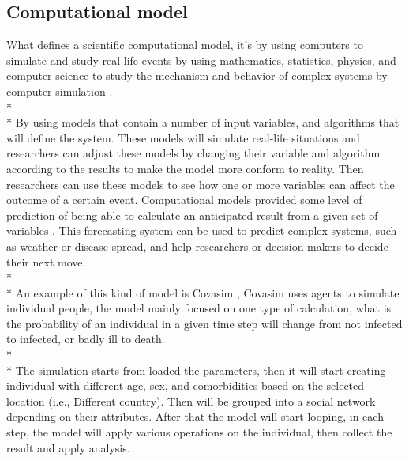 \subsection{Computational model}
What defines a scientific computational model, it’s by using computers to simulate and study real life events by using mathematics, statistics, physics, and computer science to study the mechanism and behavior of complex systems by computer simulation \cite{Reference1}. \\*\\*
By using models that contain a number of input variables, and algorithms that will define the system. These models will simulate real-life situations and researchers can adjust these models by changing their variable and algorithm according to the results to make the model more conform to reality. Then researchers can use these models to see how one or more variables can affect the outcome of a certain event. Computational models provided some level of prediction of being able to calculate an anticipated result from a given set of variables \cite{Reference4}. This forecasting system can be used to predict complex systems, such as weather or disease spread, and help researchers or decision makers to decide their next move.\\*\\*
An example of this kind of model is Covasim \cite{Reference5}, Covasim uses agents to simulate individual people, the model mainly focused on one type of calculation, what is the probability of an individual in a given time step will change from not infected to infected, or badly ill to death. \\*\\*
The simulation starts from loaded the parameters, then it will start creating individual with different age, sex, and comorbidities based on the selected location (i.e., Different country). Then will be grouped into a social network depending on their attributes. After that the model will start looping, in each step, the model will apply various operations on the individual, then collect the result and apply analysis.

